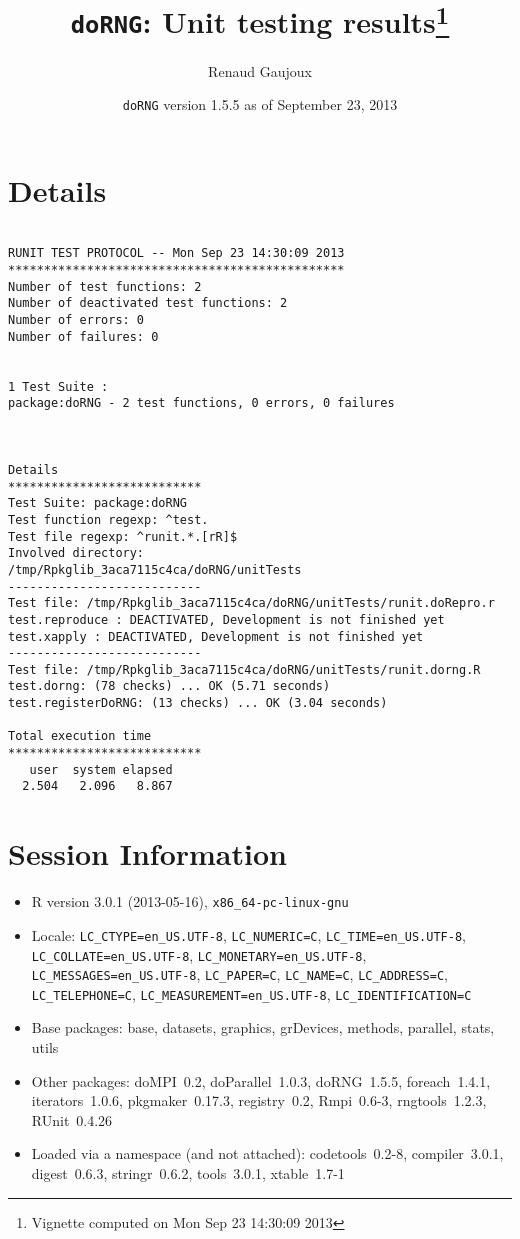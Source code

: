 \documentclass[10pt]{article}\usepackage[]{graphicx}\usepackage[]{color}
\author{Renaud Gaujoux}
\title{\texttt{doRNG}: Unit testing results\footnote{Vignette computed  on Mon Sep 23 14:30:09 2013}}
\date{\texttt{doRNG} version 1.5.5 as of September 23, 2013}
\begin{document}
\maketitle

\section{Details}
\begin{verbatim}

RUNIT TEST PROTOCOL -- Mon Sep 23 14:30:09 2013 
*********************************************** 
Number of test functions: 2 
Number of deactivated test functions: 2 
Number of errors: 0 
Number of failures: 0 

 
1 Test Suite : 
package:doRNG - 2 test functions, 0 errors, 0 failures



Details 
*************************** 
Test Suite: package:doRNG 
Test function regexp: ^test. 
Test file regexp: ^runit.*.[rR]$ 
Involved directory: 
/tmp/Rpkglib_3aca7115c4ca/doRNG/unitTests 
--------------------------- 
Test file: /tmp/Rpkglib_3aca7115c4ca/doRNG/unitTests/runit.doRepro.r 
test.reproduce : DEACTIVATED, Development is not finished yet
test.xapply : DEACTIVATED, Development is not finished yet
--------------------------- 
Test file: /tmp/Rpkglib_3aca7115c4ca/doRNG/unitTests/runit.dorng.R 
test.dorng: (78 checks) ... OK (5.71 seconds)
test.registerDoRNG: (13 checks) ... OK (3.04 seconds)

Total execution time
***************************
   user  system elapsed 
  2.504   2.096   8.867 

\end{verbatim}

\section*{Session Information}
\begin{itemize}\raggedright
  \item R version 3.0.1 (2013-05-16), \verb|x86_64-pc-linux-gnu|
  \item Locale: \verb|LC_CTYPE=en_US.UTF-8|, \verb|LC_NUMERIC=C|, \verb|LC_TIME=en_US.UTF-8|, \verb|LC_COLLATE=en_US.UTF-8|, \verb|LC_MONETARY=en_US.UTF-8|, \verb|LC_MESSAGES=en_US.UTF-8|, \verb|LC_PAPER=C|, \verb|LC_NAME=C|, \verb|LC_ADDRESS=C|, \verb|LC_TELEPHONE=C|, \verb|LC_MEASUREMENT=en_US.UTF-8|, \verb|LC_IDENTIFICATION=C|
  \item Base packages: base, datasets, graphics, grDevices, methods,
    parallel, stats, utils
  \item Other packages: doMPI~0.2, doParallel~1.0.3, doRNG~1.5.5,
    foreach~1.4.1, iterators~1.0.6, pkgmaker~0.17.3, registry~0.2,
    Rmpi~0.6-3, rngtools~1.2.3, RUnit~0.4.26
  \item Loaded via a namespace (and not attached): codetools~0.2-8,
    compiler~3.0.1, digest~0.6.3, stringr~0.6.2, tools~3.0.1,
    xtable~1.7-1
\end{itemize}
\end{document}
